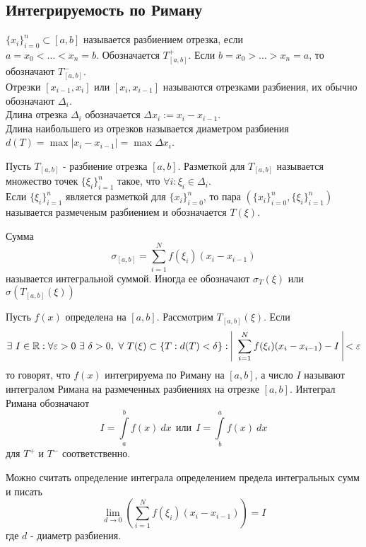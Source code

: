 \subsection{Интегрируемость по Риману}
\begin{definition}
    $\{x_i\}_{i=0}^n\subset [a,b]$ называется разбиением отрезка, если \\
    $a=x_0<\dots<x_n=b$. Обозначается $T_{[a,b]}^+$. Если $b=x_0>\dots>x_n=a$, то обозначают $T_{[a,b]}^-$.\\
    Отрезки $[x_{i-1},x_i]$ или $[x_i, x_{i-1}]$ называются отрезками разбиения, их обычно обозначают $\Delta_i$.\\
    Длина отрезка $\Delta_i$ обозначается $\Delta x_i := x_i-x_{i-1}$. \\
    Длина наибольшего из отрезков называется диаметром разбиения \\
    $d(T)=\max|x_i-x_{i-1}| = \max{\Delta x_i}$. 
\end{definition} 
\begin{definition}
    Пусть $T_{[a,b]}$ - разбиение отрезка $[a,b]$. Разметкой для $T_{[a,b]}$ называется множество точек $\{\xi_i\}_{i=1}^n$ такое, что $\forall i: \xi_i \in \Delta_i$.\\
    Если $\{\xi_i\}_{i=1}^n$ является разметкой для $\{x_i\}_{i=0}^n$, то пара $\left(\{x_i\}_{i=0}^n, \{\xi_i\}_{i=1}^n\right)$ называется размеченым разбиением и обозначается $T(\xi)$.
\end{definition} 
\begin{definition}
    Сумма 
    \[\sigma_{[a,b]}=\sum\limits_{i=1}^{N}f(\xi_i)(x_i-x_{i-1})\]
    называется интегральной суммой. Иногда ее обозначают $\sigma_T(\xi)$ или $\sigma(T_{[a,b]}(\xi))$
\end{definition} 
\begin{definition}
    Пусть $f(x)$ определена на $[a,b]$. Рассмотрим $T_{[a,b]}(\xi)$. Если \\
    \[\exists\ I\in \R: \forall \epsilon>0\ \exists\ \delta>0,\ \forall\ T(\xi)\subset \{T:d(T)<\delta\}:\ \vline\ \sum\limits_{i=1}^{N}f(\xi_i)(x_i-x_{i-1})-I\ \vline <\epsilon\]
    то говорят, что $f(x)$ интегрируема по Риману на $[a,b]$, а число $I$ называют интегралом Римана на размеченных разбиениях на отрезке $[a,b]$. Интеграл Римана обозначают
    \[I=\int\limits_{a}^{b}f(x)\ dx\ \ \text{или}\ \ I=\int\limits_{b}^{a}f(x)\ dx\]
    для $T^+$ и $T^-$ соответственно. 
\end{definition} 
\begin{comm}
    Можно считать определение интеграла определением предела интегральных сумм и писать
    \[\lim\limits_{d\to 0}\left(\sum\limits_{i=1}^{N}f(\xi_i)(x_i-x_{i-1})\right)=I\]
    где $d$ - диаметр разбиения.
\end{comm} 
